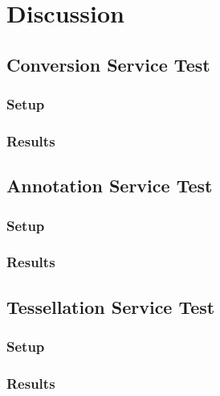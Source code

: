 \chapter{Discussion}
\section{Conversion Service Test}
\subsection{Setup}
\subsection{Results}
\section{Annotation Service Test}
\subsection{Setup}
\subsection{Results}
\section{Tessellation Service Test}
\subsection{Setup}
\subsection{Results}